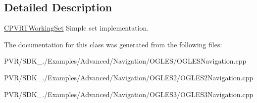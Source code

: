 \subsection{Detailed Description}


  \hyperlink{class_c_p_v_r_t_working_set}{C\+P\+V\+R\+T\+Working\+Set}  Simple set implementation. 

The documentation for this class was generated from the following files\+:\begin{DoxyCompactItemize}
\item 
P\+V\+R/\+S\+D\+K\+\_./\+Examples/\+Advanced/\+Navigation/\+O\+G\+L\+E\+S/O\+G\+L\+E\+S\+Navigation.\+cpp\item 
P\+V\+R/\+S\+D\+K\+\_./\+Examples/\+Advanced/\+Navigation/\+O\+G\+L\+E\+S2/O\+G\+L\+E\+S2\+Navigation.\+cpp\item 
P\+V\+R/\+S\+D\+K\+\_./\+Examples/\+Advanced/\+Navigation/\+O\+G\+L\+E\+S3/O\+G\+L\+E\+S3\+Navigation.\+cpp\end{DoxyCompactItemize}
